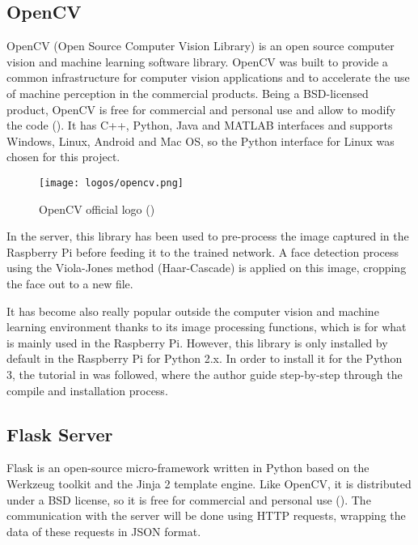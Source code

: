 	\clearpage

	\subsection{OpenCV}
	\label{subsec:opencv}
	OpenCV (Open Source Computer Vision Library) is an open source computer vision and machine learning software library. OpenCV was built to provide a common infrastructure for computer vision applications and to accelerate the use of machine perception in the commercial products. Being a BSD-licensed product, OpenCV is free for commercial and personal use and allow to modify the code (\cite{opencv_about}). It has C++, Python, Java and MATLAB interfaces and supports Windows, Linux, Android and Mac OS, so the Python interface for Linux was chosen for this project. 

	\begin{figure}[!ht]
		\centering
		\vspace{0.2cm}
		\texttt{[image: logos/opencv.png]}
		\caption{OpenCV official logo (\cite{opencv_about})}
		\label{fig:opencv}
	\end{figure}	

	In the server, this library has been used to pre-process the image captured in the Raspberry Pi before feeding it to the trained network. A face detection process using the Viola-Jones method (Haar-Cascade) is applied on this image, cropping the face out to a new file. 

	It has become also really popular outside the computer vision and machine learning environment thanks to its image processing functions, which is for what is mainly used in the Raspberry Pi. However, this library is only installed by default in the Raspberry Pi for Python 2.x. In order to install it for the Python 3, the tutorial in \cite{opencv_for_python3} was followed, where the author guide step-by-step through the compile and installation process.

	\subsection{Flask Server}
	Flask is an open-source micro-framework written in Python based on the Werkzeug toolkit and the Jinja 2 template engine. Like OpenCV, it is distributed under a BSD license, so it is free for commercial and personal use (\cite{flask_server_docs}). The communication with the server will be done using HTTP requests, wrapping the data of these requests in JSON format.

